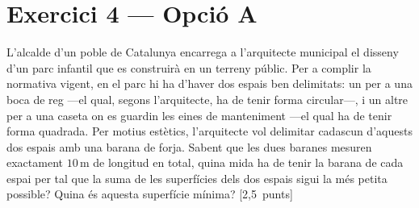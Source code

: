 \documentclass[11pt,a4paper]{article}
\begin{document}
\section*{\textcolor{blauPista}{Exercici 4 --- Opció A}}

\noindent L'alcalde d'un poble de Catalunya encarrega a l'arquitecte municipal el disseny d'un parc infantil que es construirà en un terreny públic. Per a complir la normativa vigent, en el parc hi ha d'haver dos espais ben delimitats: un per a una boca de reg ---el qual, segons l'arquitecte, ha de tenir forma circular---, i un altre per a una caseta on es guardin les eines de manteniment ---el qual ha de tenir forma quadrada. Per motius estètics, l'arquitecte vol delimitar cadascun d'aquests dos espais amb una barana de forja. Sabent que les dues baranes mesuren exactament $10\,\text{m}$ de longitud en total, quina mida ha de tenir la barana de cada espai per tal que la suma de les superfícies dels dos espais sigui la més petita possible? Quina és aquesta superfície mínima? \hspace*{\fill}\textnormal{[2,5~punts]}

\end{document}
